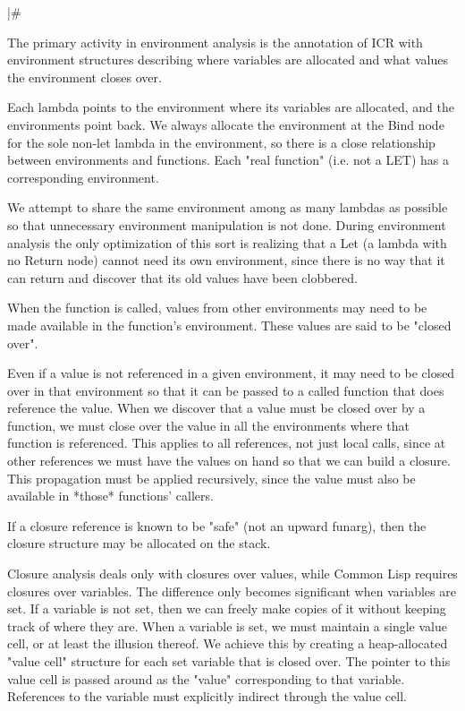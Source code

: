 |\#

The primary activity in environment analysis is the annotation of ICR with
environment structures describing where variables are allocated and what values
the environment closes over.

Each lambda points to the environment where its variables are allocated, and
the environments point back.  We always allocate the environment at the Bind
node for the sole non-let lambda in the environment, so there is a close
relationship between environments and functions.  Each "real function" (i.e.
not a LET) has a corresponding environment.

We attempt to share the same environment among as many lambdas as possible so
that unnecessary environment manipulation is not done.  During environment
analysis the only optimization of this sort is realizing that a Let (a lambda
with no Return node) cannot need its own environment, since there is no way
that it can return and discover that its old values have been clobbered.

When the function is called, values from other environments may need to be made
available in the function's environment.  These values are said to be "closed
over".

Even if a value is not referenced in a given environment, it may need to be
closed over in that environment so that it can be passed to a called function
that does reference the value.  When we discover that a value must be closed
over by a function, we must close over the value in all the environments where
that function is referenced.  This applies to all references, not just local
calls, since at other references we must have the values on hand so that we can
build a closure.  This propagation must be applied recursively, since the value
must also be available in *those* functions' callers.

If a closure reference is known to be "safe" (not an upward funarg), then the
closure structure may be allocated on the stack.

Closure analysis deals only with closures over values, while Common Lisp
requires closures over variables.  The difference only becomes significant when
variables are set.  If a variable is not set, then we can freely make copies of
it without keeping track of where they are.  When a variable is set, we must
maintain a single value cell, or at least the illusion thereof.  We achieve
this by creating a heap-allocated "value cell" structure for each set variable
that is closed over.  The pointer to this value cell is passed around as the
"value" corresponding to that variable.  References to the variable must
explicitly indirect through the value cell.

